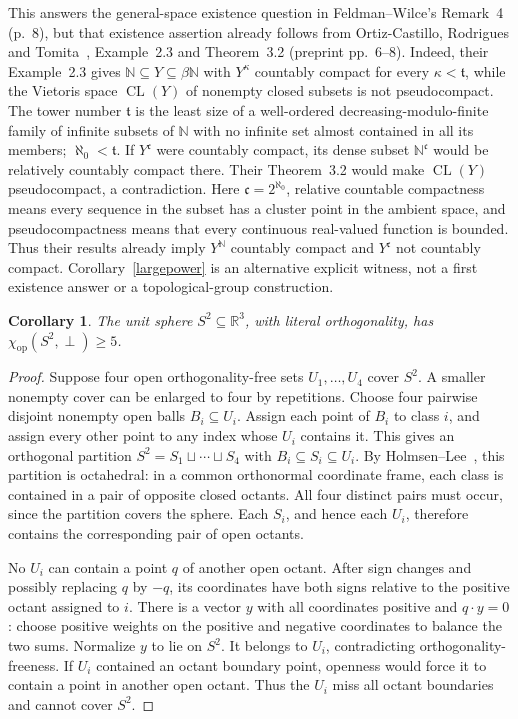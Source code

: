 \documentclass[11pt]{article}
\newtheorem{corollary}[theorem]{Corollary}
\newcommand{\N}{\mathbb N}
\newcommand{\op}{\mathrm{op}}
\begin{document}
This answers the general-space existence question in
Feldman--Wilce's Remark~4 (p.~8), but that existence assertion already
follows from Ortiz-Castillo, Rodrigues and Tomita~\cite{ORT},
Example~2.3 and Theorem~3.2 (preprint pp.~6--8).
Indeed, their Example~2.3 gives $\N\subseteq Y\subseteq\beta\N$ with
$Y^\kappa$ countably compact for every $\kappa<\mathfrak t$, while
the Vietoris space $\operatorname{CL}(Y)$ of nonempty closed subsets is
not pseudocompact. The tower number $\mathfrak t$ is the least size of a
well-ordered decreasing-modulo-finite family of infinite subsets of $\N$ with no
infinite set almost contained in all its members; $\aleph_0<\mathfrak t$.
If $Y^{\mathfrak c}$ were countably compact, its dense subset
$\N^{\mathfrak c}$ would be relatively countably compact there.
Their Theorem~3.2 would make $\operatorname{CL}(Y)$ pseudocompact,
a contradiction. Here $\mathfrak c=2^{\aleph_0}$, relative countable
compactness means every sequence in the subset has a cluster point in
the ambient space, and pseudocompactness means that every continuous
real-valued function is bounded. Thus their results already imply
$Y^\N$ countably compact and $Y^{\mathfrak c}$ not countably compact.
Corollary~\ref{largepower} is an alternative explicit witness, not a first
existence answer or a topological-group construction.

\begin{corollary}\label{sphere}
The unit sphere $S^2\subseteq\mathbb R^3$, with literal orthogonality,
has $\chi_\op(S^2,\perp)\ge5$.
\end{corollary}
\begin{proof}
Suppose four open orthogonality-free sets $U_1,\ldots,U_4$ cover $S^2$.
A smaller nonempty cover can be enlarged to four by repetitions.
Choose four pairwise disjoint nonempty open balls $B_i\subseteq U_i$.
Assign each point of $B_i$ to class $i$, and assign every other point
to any index whose $U_i$ contains it. This gives an orthogonal partition
$S^2=S_1\sqcup\cdots\sqcup S_4$ with $B_i\subseteq S_i\subseteq U_i$.
By Holmsen--Lee~\cite[Theorem~1, preprint p.~2]{HL}, this partition is
octahedral: in a common orthonormal coordinate frame, each class is
contained in a pair of opposite closed octants. All four distinct pairs
must occur, since the partition covers the sphere. Each $S_i$, and hence
each $U_i$, therefore contains the corresponding pair of open octants.

No $U_i$ can contain a point $q$ of another open octant. After sign changes
and possibly replacing $q$ by $-q$, its coordinates have both signs
relative to the positive octant assigned to $i$. There is a vector $y$
with all coordinates positive and $q\cdot y=0$: choose positive weights
on the positive and negative coordinates to balance the two sums.
Normalize $y$ to lie on $S^2$. It belongs to $U_i$, contradicting
orthogonality-freeness. If $U_i$ contained an octant boundary point,
openness would force it to contain a point in another open octant.
Thus the $U_i$ miss all octant boundaries and cannot cover $S^2$.
\end{proof}
\end{document}
